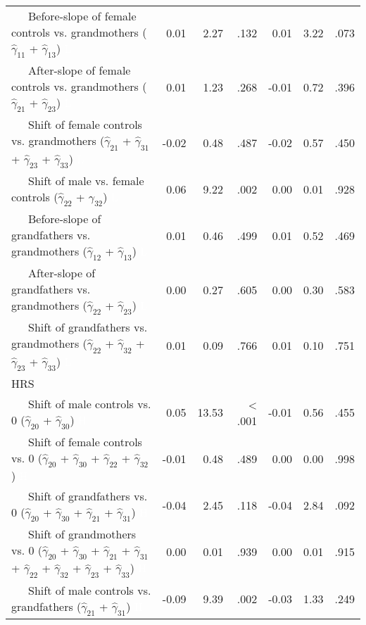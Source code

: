 \documentclass[
  english,
  man, noextraspace,floatsintext]{apa7}
\newenvironment{lltable}{\begin{landscape}\begin{center}\begin{ThreePartTable}}{\end{ThreePartTable}\end{center}\end{landscape}}
\begin{document}
\begin{appendix}
\begin{lltable}
{\begin{longtable}{lrrrrrr}
\ \ \ Before-slope of female controls vs. grandmothers 
($\hat{\gamma}_{11}$ + $\hat{\gamma}_{13}$) \textcolor{white}{L} & 0.01 & 2.27 & .132 & 0.01 & 3.22 & .073\\
\ \ \ After-slope of female controls vs. grandmothers 
($\hat{\gamma}_{21}$ + $\hat{\gamma}_{23}$) \textcolor{white}{L} & 0.01 & 1.23 & .268 & -0.01 & 0.72 & .396\\
\ \ \ Shift of female controls vs. grandmothers 
($\hat{\gamma}_{21}$ + $\hat{\gamma}_{31}$ + 
$\hat{\gamma}_{23}$ + $\hat{\gamma}_{33}$) \textcolor{white}{L} & -0.02 & 0.48 & .487 & -0.02 & 0.57 & .450\\
\ \ \ Shift of male vs. female controls 
($\hat{\gamma}_{22}$ + $\hat{\gamma}_{32}$) \textcolor{white}{L} & 0.06 & 9.22 & .002 & 0.00 & 0.01 & .928\\
\ \ \ Before-slope of grandfathers vs. grandmothers 
($\hat{\gamma}_{12}$ + $\hat{\gamma}_{13}$) \textcolor{white}{L} & 0.01 & 0.46 & .499 & 0.01 & 0.52 & .469\\
\ \ \ After-slope of grandfathers vs. grandmothers 
($\hat{\gamma}_{22}$ + $\hat{\gamma}_{23}$) \textcolor{white}{L} & 0.00 & 0.27 & .605 & 0.00 & 0.30 & .583\\
\ \ \ Shift of grandfathers vs. grandmothers 
($\hat{\gamma}_{22}$ + $\hat{\gamma}_{32}$ + 
$\hat{\gamma}_{23}$ + $\hat{\gamma}_{33}$) \textcolor{white}{L} & 0.01 & 0.09 & .766 & 0.01 & 0.10 & .751\\
HRS &  &  &  &  &  & \\
\ \ \ Shift of male controls vs. 0 ($\hat{\gamma}_{20}$ + 
$\hat{\gamma}_{30}$) \textcolor{white}{H} & 0.05 & 13.53 & < .001 & -0.01 & 0.56 & .455\\
\ \ \ Shift of female controls vs. 0 ($\hat{\gamma}_{20}$ + 
$\hat{\gamma}_{30}$ + $\hat{\gamma}_{22}$ + 
$\hat{\gamma}_{32}$) \textcolor{white}{H} & -0.01 & 0.48 & .489 & 0.00 & 0.00 & .998\\
\ \ \ Shift of grandfathers vs. 0 ($\hat{\gamma}_{20}$ + 
$\hat{\gamma}_{30}$ + $\hat{\gamma}_{21}$ + 
$\hat{\gamma}_{31}$) \textcolor{white}{H} & -0.04 & 2.45 & .118 & -0.04 & 2.84 & .092\\
\ \ \ Shift of grandmothers vs. 0 ($\hat{\gamma}_{20}$ + 
$\hat{\gamma}_{30}$ + $\hat{\gamma}_{21}$ + 
$\hat{\gamma}_{31}$ + $\hat{\gamma}_{22}$ + 
$\hat{\gamma}_{32}$ + $\hat{\gamma}_{23}$ +
$\hat{\gamma}_{33}$) \textcolor{white}{H} & 0.00 & 0.01 & .939 & 0.00 & 0.01 & .915\\
\ \ \ Shift of male controls vs. grandfathers 
($\hat{\gamma}_{21}$ + $\hat{\gamma}_{31}$) \textcolor{white}{H} & -0.09 & 9.39 & .002 & -0.03 & 1.33 & .249\\

\end{longtable}}
\end{lltable}
\end{appendix}
\end{document}
